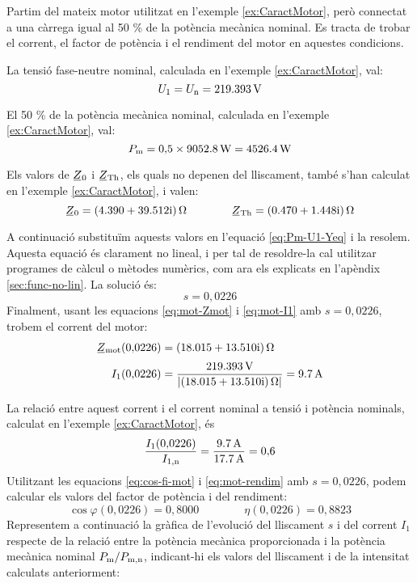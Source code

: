 \begin{exemple}\label{ex:MotCarregaReduida}
	\addcontentsxms{\MotCarregaReduida}
	Partim del mateix motor utilitzat en l'exemple \vref{ex:CaractMotor}, però connectat a una càrrega igual  al 50 \% de la potència mecànica nominal. Es tracta de trobar el corrent, el factor de potència i el rendiment del motor en aquestes condicions.

	La tensió  fase-neutre  nominal, calculada  en l'exemple \ref{ex:CaractMotor}, val: 
	\[
		U_1 = U_\mathrm{n} = \qty{219,393}{V}
	\]
	
	El 50 \% de la potència mecànica nominal, calculada  en l'exemple \ref{ex:CaractMotor}, val:
	\[
		P_\mathrm{m} =  0{,}5\times\qty{9052,8}{W} = \qty{4526,4}{W}
	\]

	Els valors de $\cmplx{Z}_0$ i  $\cmplx{Z}\ped{Th}$, els quals no depenen del lliscament, també s'han calculat en  l'exemple \ref{ex:CaractMotor}, i valen:
	\[
       \cmplx{Z}_0 =  \complexqty{4,390+j39,512}{\ohm} 
       \qquad \qquad
       \cmplx{Z}\ped{Th} = \complexqty{0,470+j1,448}{\ohm} 
	\]
	
	A continuació  substituïm aquests valors en l'equació \eqref{eq:Pm-U1-Yeq} i la resolem.  Aquesta equació és clarament no lineal, i per tal de resoldre-la cal utilitzar programes de càlcul o mètodes numèrics, com ara els explicats en l'apèndix \ref{sec:func-no-lin}. La solució és:
	\[
		s = 0{,}0226
	\]
	Finalment, usant les equacions \eqref{eq:mot-Zmot} i \eqref{eq:mot-I1} amb $s  = 0{,}0226$,  trobem el corrent del motor:
	\begin{align*}
	\cmplx{Z}\ped{mot}(0{,}0226) &=  \complexqty{18,015+j13,510}{\ohm} \\[0.5ex]
	I_1(0{,}0226) &= \frac{\qty{219,393}{V}}{|\complexqty{18,015+j13,510}{\ohm}|} = \qty{9,7}{A}
	\end{align*}
	
	La relació entre aquest  corrent i el corrent nominal a tensió i potència nominals, calculat en l'exemple \ref{ex:CaractMotor}, és
	\[
	\frac{I_1(0{,}0226)}{I_\mathrm{1,n}} = \frac{\qty{9,7}{A}}{\qty{17,7}{A}} = 0{,}6
	\]
	Utilitzant les equacions  \eqref{eq:cos-fi-mot} i \eqref{eq:mot-rendim} amb $s  = 0{,}0226$, podem calcular els valors del factor de potència i del rendiment:
	\[
		\cos\varphi(0{,}0226) =  0{,}8000 \qquad \qquad
		\eta(0{,}0226) =  0{,}8823
	\]
	Representem a continuació la gràfica de l'evolució del lliscament $s$ i del corrent $I_1$ respecte de la relació entre la potència mecànica proporcionada i la potència mecànica nominal $P_\mathrm{m}/P_\mathrm{m,n}$, indicant-hi els valors del lliscament i de la intensitat calculats anteriorment:
	\begin{center}
		
	\end{center}


\end{exemple}
